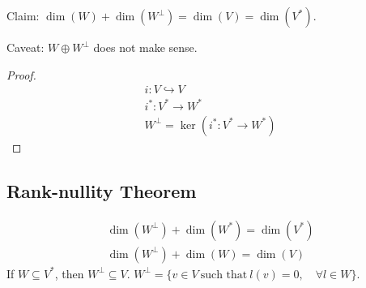 \documentclass[class=scrartcl, crop=false]{standalone}
\begin{document}
Claim: $\dim(W) + \dim(W^{\perp}) = \dim(V) = \dim(V^*)$.

Caveat: $W \oplus W^{\perp}$ does not make sense.
\begin{proof}
  \begin{gather*}
    i: V \hookrightarrow V \\
    i^* : V^* \to W^* \\
    W^{\perp} = \ker(i^*: V^* \to W^*)
  \end{gather*} 
\end{proof} 

\subsection{Rank-nullity Theorem}
\begin{gather*}
  \dim(W^\perp) + \dim(W^*) = \dim(V^*) \\
  \dim(W^\perp) + \dim(W) = \dim(V)
\end{gather*} 
If $W \subseteq V^*$, then $W^\perp \subseteq V$. $W^\perp = \{v \in V \ \text{such that} \ l(v) = 0, \quad \forall l \in W\}$.
\end{document}
